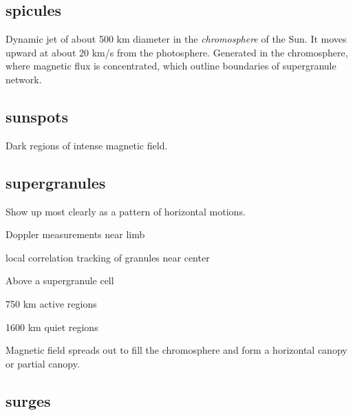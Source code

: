 \documentclass[12pt]{article}
\begin{document}
\subsection*{spicules}
Dynamic jet of about 500 km diameter in the \emph{chromosphere} of the Sun.
It moves upward at about 20 km/s from the photosphere. Generated in the
chromosphere, where magnetic flux is concentrated, which outline boundaries
of supergranule network.

\subsection*{sunspots}
Dark regions of intense magnetic field.

\subsection*{supergranules}
Show up most clearly as a pattern of horizontal motions.
\begin{itemize*}
    \item Doppler measurements near limb
    \item local correlation tracking of granules near center
\end{itemize*}
Above a supergranule cell
\begin{itemize*}
    \item 750 km active regions
    \item 1600 km quiet regions
\end{itemize*}
Magnetic field spreads out to fill the chromosphere and form a
horizontal canopy or partial canopy.

\subsection*{surges}
\end{document}
